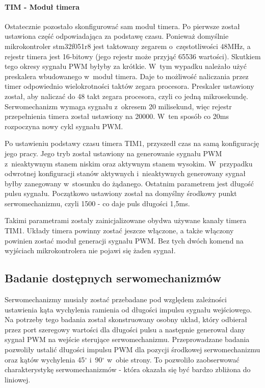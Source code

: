 \documentclass[eng,oneside]{mgr}
\begin{document}
				\paragraph{TIM - Moduł timera}
				Ostatecznie pozostało skonfigurować sam moduł timera. Po pierwsze został ustawiona część odpowiadająca za podstawę czasu. Ponieważ domyślnie mikrokontroler stm32f051r8 jest taktowany zegarem o~częstotliwości 48MHz, a rejestr timera jest 16-bitowy (jego rejestr może przyjąć 65536 wartości). Skutkiem tego okresy sygnału PWM byłyby za krótkie. W~tym wypadku należało użyć preskalera wbudowanego w~moduł timera. Daje to możliwość naliczania przez timer odpowiednio wielokrotności taktów zegara procesora. Preskaler ustawiony został, aby naliczać do 48 takt zegara procesora, czyli co jedną mikrosekundę. Serwomechanizm wymaga sygnału z~okresem 20 milisekund, więc rejestr przepełnienia timera został ustawiony na 20000. W~ten sposób co 20ms rozpoczyna nowy cykl sygnału PWM.

				Po ustawieniu podstawy czasu timera TIM1, przyszedł czas na samą konfigurację jego pracy. Jego tryb został ustawiony na generowanie sygnału PWM z~nieaktywnym stanem niskim oraz aktywnym stanem wysokim. W~przypadku odwrotnej konfiguracji stanów aktywnych i~nieaktywnych generowany sygnał byłby zanegowany w~stosunku do żądanego. Ostatnim parametrem jest długość pulsu sygnału. Początkowo ustawiony został na domyślny środkowy punkt serwomechanizmu, czyli 1500 - co daje puls długości 1,5ms.

				Takimi parametrami zostały zainicjalizowane obydwa używane kanały timera TIM1. Układy timera powinny zostać jeszcze włączone, a także włączony powinien zostać moduł generacji sygnału PWM. Bez tych dwóch komend na wyjściach mikrokontrolera nie pojawi się żaden sygnał.

			\subsection{Badanie dostępnych serwomechanizmów}
			\label{ssec:servo_analysis}
			Serwomechanizmy musiały zostać przebadane pod względem zależności ustawienia kąta wychylenia ramienia od długości impulsu sygnału wejściowego. Na potrzeby tego badania został skonstruowany osobny układ, który odbierał przez port szeregowy wartości dla długości pulsu a następnie generował dany sygnał PWM na wejście sterujące serwomechanizmu. Przeprowadzane badania pozwoliły ustalić długości impulsu PWM dla pozycji środkowej serwomechanizmu oraz kątów wychylenia 45$^{\circ}$ i~90$^{\circ}$ w~obie strony. To pozwoliło zaobserwować charakterystykę serwomechanizmów - która okazała się być bardzo zbliżona do liniowej.
\end{document}
